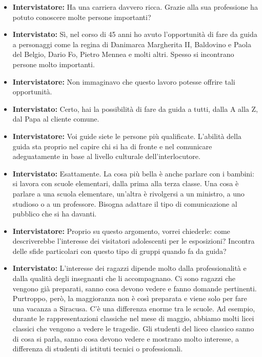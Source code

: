 \documentclass{article}
\begin{document}
\begin{itemize}
    \item \textbf{Intervistatore:} Ha una carriera davvero ricca. Grazie alla sua professione ha potuto conoscere molte persone importanti?
    
    \item \textbf{Intervistato:} Sì, nel corso di 45 anni ho avuto l’opportunità di fare da guida a personaggi come la regina di Danimarca Margherita II, Baldovino e Paola del Belgio, Dario Fo, Pietro Mennea e molti altri. Spesso si incontrano persone molto importanti.
    
    \item \textbf{Intervistatore:} Non immaginavo che questo lavoro potesse offrire tali opportunità.
    
    \item \textbf{Intervistato:} Certo, hai la possibilità di fare da guida a tutti, dalla A alla Z, dal Papa al cliente comune.
    
    \item \textbf{Intervistatore:} Voi guide siete le persone più qualificate. L’abilità della guida sta proprio nel capire chi si ha di fronte e nel comunicare adeguatamente in base al livello culturale dell’interlocutore.
    
    \item \textbf{Intervistato:} Esattamente. La cosa più bella è anche parlare con i bambini: si lavora con scuole elementari, dalla prima alla terza classe. Una cosa è parlare a una scuola elementare, un’altra è rivolgersi a un ministro, a uno studioso o a un professore. Bisogna adattare il tipo di comunicazione al pubblico che si ha davanti.
    
    \item \textbf{Intervistatore:} Proprio su questo argomento, vorrei chiederle: come descriverebbe l’interesse dei visitatori adolescenti per le esposizioni? Incontra delle sfide particolari con questo tipo di gruppi quando fa da guida?
    
    \item \textbf{Intervistato:} L’interesse dei ragazzi dipende molto dalla professionalità e dalla qualità degli insegnanti che li accompagnano. Ci sono ragazzi che vengono già preparati, sanno cosa devono vedere e fanno domande pertinenti. Purtroppo, però, la maggioranza non è così preparata e viene solo per fare una vacanza a Siracusa. C’è una differenza enorme tra le scuole. Ad esempio, durante le rappresentazioni classiche nel mese di maggio, abbiamo molti licei classici che vengono a vedere le tragedie. Gli studenti del liceo classico sanno di cosa si parla, sanno cosa devono vedere e mostrano molto interesse, a differenza di studenti di istituti tecnici o professionali.
    

\end{itemize}
\end{document}
